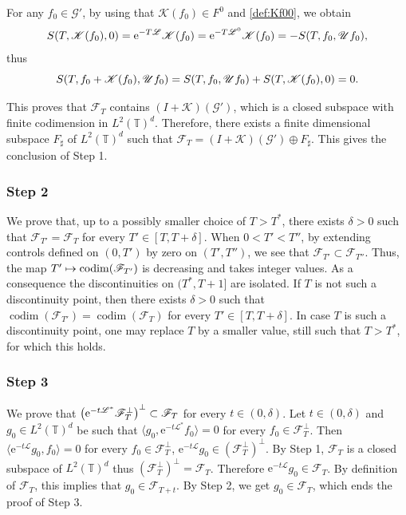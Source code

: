 \documentclass[10pt]{amsart}
\let\mathcal\mathscr
\def\mto{\mathchoice{\longmapsto}{\mapsto}{\mapsto}{\mapsto}}
\theoremstyle{plain}
\theoremstyle{definition}
\theoremstyle{remark}
\DeclareMathOperator{\codim}{codim}
\newcommand{\set}{\mathbb}
\newcommand{\T}{\set{T}}
\newcommand{\eu}{\mathrm e}
\let\originalleft\left
\let\originalright\right
\renewcommand{\left}{\mathopen{}\mathclose\bgroup\originalleft}
\renewcommand{\right}{\aftergroup\egroup\originalright}
\begin{document}
For any $f_0 \in \mathcal{G}'$, by using that $\mathcal{K}(f_0) \in F^0$ and \eqref{def:Kf00}, we obtain\vspace*{-2pt}
\[
S\left(T,\mathcal{K}(f_0),0\right)=
\eu^{-T\mathcal{L}} \mathcal{K}(f_0) =
\eu^{-T\mathcal{L}^0} \mathcal{K}(f_0) =
- S(T,f_0,\mathcal{U} f_0),
\]
thus\vspace*{-3pt}
\[
S\left(T,f_0+\mathcal{K}(f_0),\mathcal{U} f_0\right)=S\left(T,f_0,\mathcal{U} f_0 \right)+ S\left(T,\mathcal{K}(f_0),0\right)=0.
\]

This proves that $\mathcal{F}_{T}$ contains $(I+\mathcal{K})(\mathcal{G}')$,
which is a closed subspace with finite codimension in $L^2(\T)^d$. Therefore, there exists a finite dimensional subspace $F_\sharp$ of $L^2(\T)^d$ such that
$\mathcal{F}_{T} = (I+\mathcal{K})(\mathcal{G}') \oplus F_\sharp$. This gives the conclusion of Step 1.

\subsubsection*{Step 2}
We prove that, up to a possibly smaller choice of $T>T^\ast$, there exists $\delta>0$ such that $\mathcal{F}_{T'}=\mathcal{F}_{T}$ for every $T'\in[T,T+\delta]$.
When $0<T'<T''$, by extending controls defined on $(0,T')$ by zero on $(T',T'')$, we see that $\mathcal{F}_{T'} \subset \mathcal{F}_{T''}$. Thus, the map $T' \mto \codim(\mathcal{F}_{T'})$ is decreasing and takes integer values. As a consequence the discontinuities on $(T^\ast,T+1]$ are isolated. If $T$ is not such a discontinuity point, then there exists $\delta>0$ such that $\codim(\mathcal{F}_{T'})=\codim(\mathcal{F}_{T})$ for every $T'\in[T,T+\delta]$. In case $T$ is such a discontinuity point, one may replace $T$ by a smaller value, still such that $T>T^\ast$, for which this holds.

\subsubsection*{Step 3}
We prove that $\left(\eu^{-t {\mathcal{L}^*}} \mathcal{F}_{T}^{\perp} \right)^\perp \subset \mathcal{F}_{T}$ for every $t\in(0,\delta)$. Let $t \in (0,\delta)$ and $g_0 \in L^2(\T)^d$ be such that $\langle g_0, \eu^{-t {\mathcal{L}^*}} f_0 \rangle = 0$ for every $f_0 \in \mathcal{F}_{T}^{\perp}$. Then $\langle \eu^{-t {\mathcal{L}}} g_0, f_0 \rangle = 0$ for every $f_0 \in \mathcal{F}_{T}^{\perp}$, \ie
$\eu^{-t {\mathcal{L}}} g_0 \in (\mathcal{F}_{T}^{\perp})^\perp$.
By Step 1, $\mathcal{F}_{T}$ is a closed subspace of $L^2(\T)^d$ thus $(\mathcal{F}_{T}^{\perp})^\perp = \mathcal{F}_{T}$. Therefore $\eu^{-t {\mathcal{L}}} g_0 \in \mathcal{F}_{T}$. By definition of $\mathcal{F}_T$, this implies that $g_0 \in \mathcal{F}_{T+t}$. By Step 2, we get $g_0 \in \mathcal{F}_T$, which ends the proof of Step 3.
\end{document}
